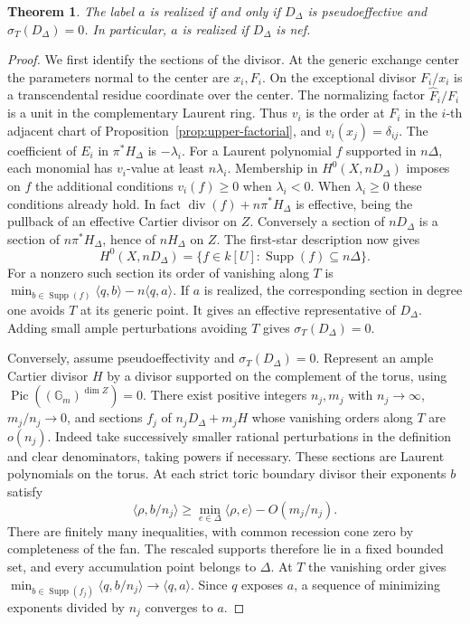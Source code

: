 \documentclass[11pt,reqno]{amsart}
\numberwithin{equation}{section}
\newtheorem{theorem}{Theorem}[section]
\theoremstyle{definition}
\theoremstyle{remark}
\DeclareMathOperator{\Supp}{Supp}
\DeclareMathOperator{\Pic}{Pic}
\begin{document}
\begin{theorem}\label{thm:numerical-realization}
The label \(a\) is realized if and only if \(D_\Delta\)
is pseudoeffective and \(\sigma_T(D_\Delta)=0\).
In particular, \(a\) is realized if \(D_\Delta\) is nef.
\end{theorem}

\begin{proof}
We first identify the sections of the divisor. At the generic exchange
center the parameters normal to the center are \(x_i,F_i\). On the
exceptional divisor \(F_i/x_i\) is a transcendental residue coordinate
over the center. The normalizing factor \(\widehat F_i/F_i\) is a
unit in the complementary Laurent ring. Thus \(v_i\) is the order
at \(F_i\) in the \(i\)-th adjacent chart of
Proposition~\ref{prop:upper-factorial}, and \(v_i(x_j)=\delta_{ij}\).
The coefficient of \(E_i\) in \(\pi^*H_\Delta\) is \(-\lambda_i\).
For a Laurent polynomial \(f\) supported in \(n\Delta\), each
monomial has \(v_i\)-value at least \(n\lambda_i\).
Membership in \(H^0(X,nD_\Delta)\) imposes on \(f\) the additional
conditions \(v_i(f)\ge0\) when \(\lambda_i<0\). When
\(\lambda_i\ge0\) these conditions already hold. In fact
\(\operatorname{div}(f)+n\pi^*H_\Delta\) is effective, being the
pullback of an effective Cartier divisor on \(Z\). Conversely a
section of \(nD_\Delta\) is a section of \(n\pi^*H_\Delta\), hence
of \(nH_\Delta\) on \(Z\). The first-star description now gives
\[ H^0(X,nD_\Delta)= \{f\in k[U]:\Supp(f)\subseteq n\Delta\}. \]
For a nonzero such section its order of vanishing along \(T\) is
\(\min_{b\in\Supp(f)}\langle q,b\rangle-n\langle q,a\rangle\).
If \(a\) is realized, the corresponding section in degree one avoids
\(T\) at its generic point. It gives an effective representative
of \(D_\Delta\). Adding small ample perturbations avoiding \(T\)
gives \(\sigma_T(D_\Delta)=0\).

Conversely, assume pseudoeffectivity and \(\sigma_T(D_\Delta)=0\).
Represent an ample Cartier divisor \(H\) by a divisor supported on
the complement of the torus, using \(\Pic((\mathbb G_m)^{\dim Z})=0\).
There exist positive integers \(n_j,m_j\) with \(n_j\to\infty\),
\(m_j/n_j\to0\), and sections \(f_j\) of
\(n_jD_\Delta+m_jH\) whose vanishing orders along \(T\) are \(o(n_j)\).
Indeed take successively smaller rational perturbations in the
definition and clear denominators, taking powers if necessary.
These sections are Laurent polynomials on the torus.
At each strict toric boundary divisor their exponents \(b\) satisfy
\[ \langle \rho,b/n_j\rangle \ge \min_{e\in\Delta}\langle\rho,e\rangle-O(m_j/n_j). \]
There are finitely many inequalities, with common recession cone
zero by completeness of the fan. The rescaled supports therefore
lie in a fixed bounded set, and every accumulation point belongs
to \(\Delta\). At \(T\) the vanishing order gives
\(\min_{b\in\Supp(f_j)}\langle q,b/n_j\rangle\to\langle q,a\rangle\).
Since \(q\) exposes \(a\), a sequence of minimizing exponents divided
by \(n_j\) converges to \(a\).


\end{proof}
\end{document}
